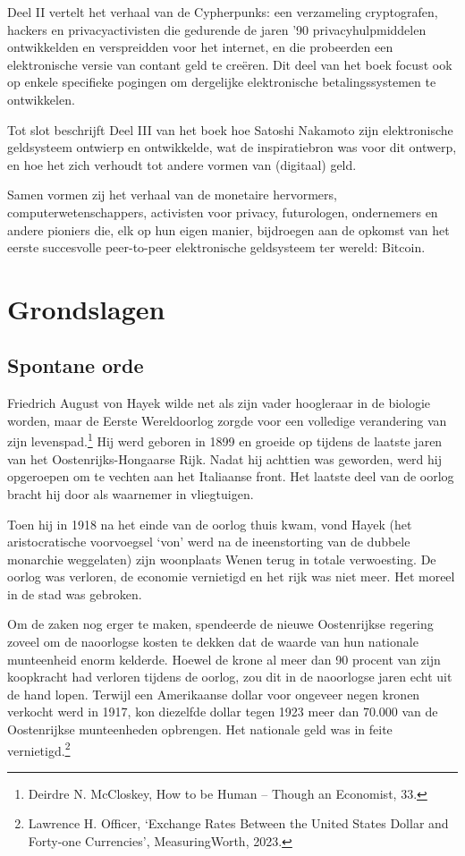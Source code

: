 \documentclass[smalldemyvopaper,11pt,twoside,onecolumn,openright,extrafontsizes,hidelinks]{memoir}
\begin{document}
Deel II vertelt het verhaal van de Cypherpunks: een verzameling
cryptografen, hackers en privacyactivisten die gedurende de jaren '90
privacyhulpmiddelen ontwikkelden en verspreidden voor het internet, en
die probeerden een elektronische versie van contant geld te creëren. Dit
deel van het boek focust ook op enkele specifieke pogingen om dergelijke
elektronische betalingssystemen te ontwikkelen.

Tot slot beschrijft Deel III van het boek hoe Satoshi Nakamoto zijn
elektronische geldsysteem ontwierp en ontwikkelde, wat de inspiratiebron
was voor dit ontwerp, en hoe het zich verhoudt tot andere vormen van
(digitaal) geld.

Samen vormen zij het verhaal van de monetaire hervormers,
computerwetenschappers, activisten voor privacy, futurologen,
ondernemers en andere pioniers die, elk op hun eigen manier, bijdroegen
aan de opkomst van het eerste succesvolle peer-to-peer elektronische
geldsysteem ter wereld: Bitcoin.

\part{Grondslagen}

\chapter{Spontane orde}\label{spontane-orde}

Friedrich August von Hayek wilde net als zijn vader hoogleraar in de
biologie worden, maar de Eerste Wereldoorlog zorgde voor een volledige
verandering van zijn levenspad.\footnote{\hspace{0pt}Deirdre N.
  McCloskey, How to be Human -- Though an Economist, 33.} Hij werd
geboren in 1899 en groeide op tijdens de laatste jaren van het
Oostenrijks-Hongaarse Rijk. Nadat hij achttien was geworden, werd hij
opgeroepen om te vechten aan het Italiaanse front. Het laatste deel van
de oorlog bracht hij door als waarnemer in vliegtuigen.

Toen hij in 1918 na het einde van de oorlog thuis kwam, vond Hayek (het
aristocratische voorvoegsel `von' werd na de ineenstorting van de
dubbele monarchie weggelaten) zijn woonplaats Wenen terug in totale
verwoesting. De oorlog was verloren, de economie vernietigd en het rijk
was niet meer. Het moreel in de stad was gebroken.

Om de zaken nog erger te maken, spendeerde de nieuwe Oostenrijkse
regering zoveel om de naoorlogse kosten te dekken dat de waarde van hun
nationale munteenheid enorm kelderde. Hoewel de krone al meer dan 90
procent van zijn koopkracht had verloren tijdens de oorlog, zou dit in
de naoorlogse jaren echt uit de hand lopen. Terwijl een Amerikaanse
dollar voor ongeveer negen kronen verkocht werd in 1917, kon diezelfde
dollar tegen 1923 meer dan 70.000 van de Oostenrijkse munteenheden
opbrengen. Het nationale geld was in feite vernietigd.\footnote{\hspace{0pt}Lawrence
  H. Officer, `Exchange Rates Between the United States Dollar and
  Forty-one Currencies', MeasuringWorth, 2023.}
\end{document}
